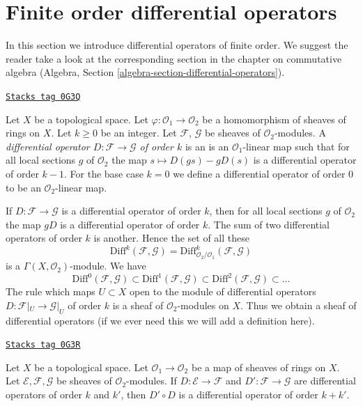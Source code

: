 \section{Finite order differential operators}
\label{modules-section-differential-operators}
In this section we introduce differential operators of finite order.
We suggest the reader take a look at the corresponding section
in the chapter on commutative algebra
(Algebra, Section \ref{algebra-section-differential-operators}).

\begin{definition}
\label{modules-definition-differential-operators}
\href{https://stacks.math.columbia.edu/tag/0G3Q}{\texttt{Stacks tag 0G3Q}}

Let $X$ be a topological space. Let $\varphi : \mathcal{O}_1 \to \mathcal{O}_2$
be a homomorphism of sheaves of rings on $X$. Let $k \geq 0$ be an integer.
Let $\mathcal{F}$, $\mathcal{G}$ be sheaves of $\mathcal{O}_2$-modules.
A {\it differential operator $D : \mathcal{F} \to \mathcal{G}$ of order $k$}
is an is an $\mathcal{O}_1$-linear map such that for all local sections
$g$ of $\mathcal{O}_2$ the map $s \mapsto D(gs) - gD(s)$ is a
differential operator of order $k - 1$. For the base case $k = 0$
we define a differential operator of order $0$ to be an
$\mathcal{O}_2$-linear map.
\end{definition}

If $D : \mathcal{F} \to \mathcal{G}$ is a differential operator of order $k$,
then for all local sections $g$ of $\mathcal{O}_2$ the map $gD$ is a
differential operator of order $k$. The sum of two differential operators of
order $k$ is another. Hence the set of all these
$$
\text{Diff}^k(\mathcal{F}, \mathcal{G}) =
\text{Diff}^k_{\mathcal{O}_2/\mathcal{O}_1}(\mathcal{F}, \mathcal{G})
$$
is a $\Gamma(X, \mathcal{O}_2)$-module. We have
$$
\text{Diff}^0(\mathcal{F}, \mathcal{G}) \subset
\text{Diff}^1(\mathcal{F}, \mathcal{G}) \subset
\text{Diff}^2(\mathcal{F}, \mathcal{G}) \subset \ldots
$$
The rule which maps $U \subset X$ open to the module of
differential operators $D : \mathcal{F}|_U \to \mathcal{G}|_U$
of order $k$ is a sheaf of $\mathcal{O}_2$-modules on $X$.
Thus we obtain a sheaf of differential operators (if we ever need this we will
add a definition here).

\begin{lemma}
\label{modules-lemma-composition-differential-operators}
\href{https://stacks.math.columbia.edu/tag/0G3R}{\texttt{Stacks tag 0G3R}}

Let $X$ be a topological space.
Let $\mathcal{O}_1 \to \mathcal{O}_2$ be a map of sheaves of rings on $X$.
Let $\mathcal{E}, \mathcal{F}, \mathcal{G}$ be sheaves of
$\mathcal{O}_2$-modules.
If $D : \mathcal{E} \to \mathcal{F}$ and $D' : \mathcal{F} \to \mathcal{G}$
are differential operators of order $k$ and $k'$, then $D' \circ D$ is a
differential operator of order $k + k'$.
\end{lemma}

